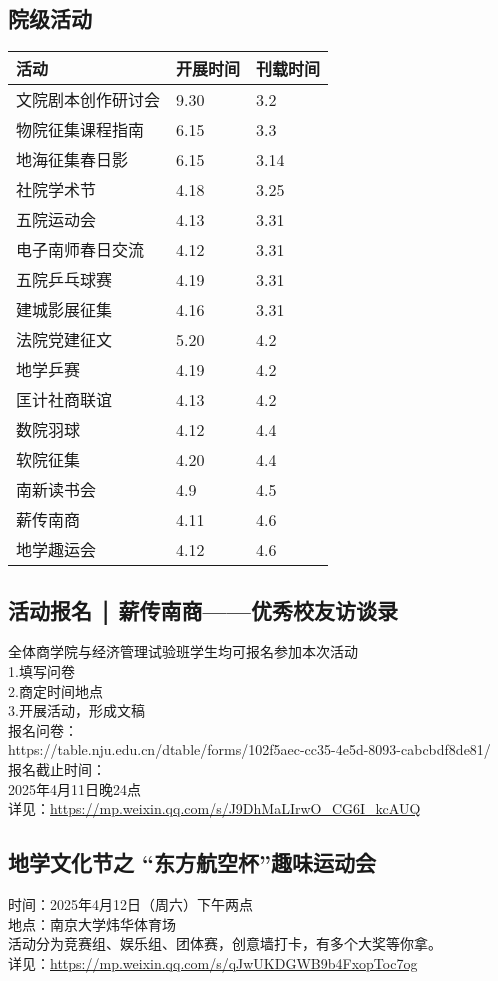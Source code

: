 \documentclass[letterpaper, 12pt]{article}
\begin{document}
\begin{multicols}{2}
\section{院级活动}
\begin{tabular}{|>{\centering\arraybackslash}m{}|m{}|m{}|}
\hline
    活动 & 开展时间 & 刊载时间\\
    \hline\hline
    文院剧本创作研讨会 & 9.30 & 3.2\\
    物院征集课程指南 & 6.15 & 3.3\\
    地海征集春日影 & 6.15 & 3.14\\
    社院学术节 & 4.18 & 3.25\\
    五院运动会 & 4.13 & 3.31\\
    电子南师春日交流 & 4.12 & 3.31\\
    五院乒乓球赛 & 4.19 & 3.31\\
    建城影展征集 & 4.16 & 3.31\\
    法院党建征文 & 5.20 & 4.2\\
    地学乒赛 & 4.19 & 4.2\\
    匡计社商联谊 & 4.13 & 4.2\\
    数院羽球 & 4.12 & 4.4\\
    软院征集 & 4.20 & 4.4\\
    南新读书会 & 4.9 & 4.5\\
    薪传南商 & 4.11 & 4.6\\
    地学趣运会 & 4.12 & 4.6\\
    \hline
\end{tabular}

\subsection{活动报名 ￨ 薪传南商——优秀校友访谈录}
全体商学院与经济管理试验班学生均可报名参加本次活动
\\1.填写问卷
\\2.商定时间地点
\\3.开展活动，形成文稿
\\报名问卷：
\\https://table.nju.edu.cn/dtable/forms/102f5aec-cc35-4e5d-8093-cabcbdf8de81/
\\报名截止时间：
\\2025年4月11日晚24点
\\详见：\url{https://mp.weixin.qq.com/s/J9DhMaLIrwO_CG6I_kcAUQ}

\subsection{地学文化节之 “东方航空杯”趣味运动会}
时间：2025年4月12日（周六）下午两点
\\地点：南京大学炜华体育场
\\活动分为竞赛组、娱乐组、团体赛，创意墙打卡，有多个大奖等你拿。
\\详见：\url{https://mp.weixin.qq.com/s/qJwUKDGWB9b4FxopToc7og}



\end{multicols}
\end{document}
